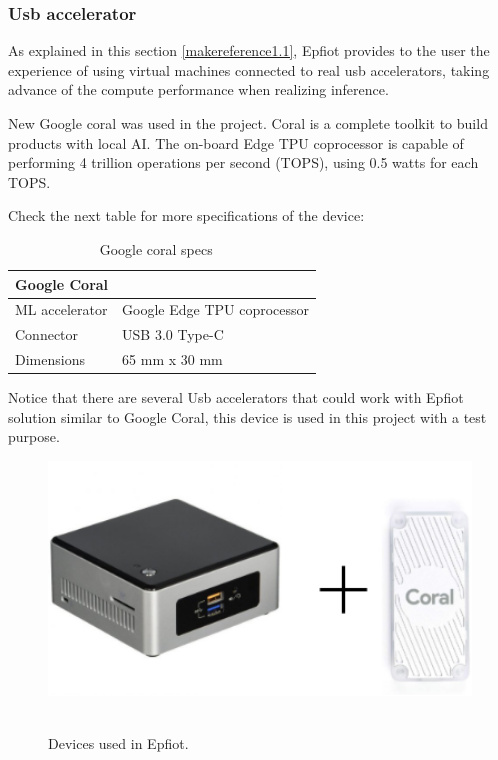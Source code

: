 \subsubsection{Usb accelerator}
As explained in this section \ref{makereference1.1}, Epfiot provides to the user the experience of using virtual machines connected to real usb accelerators, taking advance of the compute performance when realizing inference.

New Google coral was used in the project. Coral is a complete toolkit to build products with local AI. The on-board Edge TPU coprocessor is capable of performing 4 trillion operations per second (TOPS), using 0.5 watts for each TOPS.

Check the next table for more specifications of the device:

\begin{table}[H]
    \begin{center}
    \begin{tabular}[b]{|l|l|}
        \hline
        \textbf{Google Coral} & \\
        \hline
        ML accelerator & Google Edge TPU coprocessor\\
        Connector & USB 3.0 Type-C\\
        Dimensions & 65 mm x 30 mm\\
        \hline
    \end{tabular}
    \caption{Google coral specs ~\cite{coral_specs}}
    \label{table1}
   \end{center}
\end{table}


Notice that there are several Usb accelerators that could work with Epfiot solution similar to Google Coral, this device is used in this project with a test purpose.

\begin{figure}[h!]%
\centering
    \includegraphics[width=4.5in]{figures/hardware.png}
~\caption{Devices used in Epfiot.}
\label{figure3.2}
\end{figure}
\newpage

